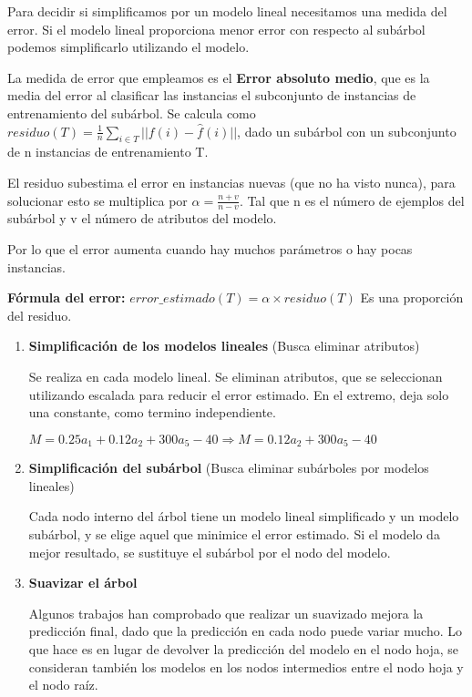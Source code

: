 \documentclass[12pt, twoside, openright]{report} %
\begin{document}
Para decidir si simplificamos por un modelo lineal necesitamos una medida del error. Si el modelo lineal proporciona menor error con respecto al subárbol podemos simplificarlo utilizando el modelo.

La medida de error que empleamos es el \textbf{Error absoluto medio}, que es la media del error al clasificar las instancias el subconjunto de instancias de entrenamiento del subárbol. Se calcula como $residuo(T) = \frac 1 n \sum _{i \in T} ||f(i)- \hat{f}(i)||$, dado un subárbol con un subconjunto de n instancias de entrenamiento T.

El residuo subestima el error en instancias nuevas (que no ha visto nunca), para solucionar esto se multiplica por \(\alpha = \frac {n+v}{n-v}\). Tal que n es el número de ejemplos del subárbol y v el número de atributos del modelo.

Por lo que el error aumenta cuando hay muchos parámetros o hay pocas instancias.

\textbf{Fórmula del error:} \(error\_estimado(T) = \alpha \times residuo(T)\) Es una proporción del residuo.

\begin{enumerate}
	\def\labelenumi{\arabic{enumi}.}
	\item \textbf{Simplificación de los modelos lineales} (Busca eliminar atributos)

	      Se realiza en cada modelo lineal. Se eliminan atributos, que se seleccionan utilizando escalada para reducir el error estimado. En el extremo, deja solo una constante, como termino independiente.

	      \(M= 0.25a_1+0.12a_2+300a_5-40 \Rightarrow M=0.12a_2+300a_5-40\)
	\item \textbf{Simplificación del subárbol} (Busca eliminar subárboles por modelos lineales)

	      Cada nodo interno del árbol tiene un modelo lineal simplificado y un modelo subárbol, y se elige aquel que minimice el error estimado. Si el modelo da mejor resultado, se sustituye el subárbol por el nodo del modelo.
	\item \textbf{Suavizar el árbol}

	      Algunos trabajos han comprobado que realizar un suavizado mejora la predicción final, dado que la predicción en cada nodo puede variar mucho. Lo que hace es en lugar de devolver la predicción del modelo en el nodo hoja, se consideran también los modelos en los nodos intermedios entre el nodo hoja y el nodo raíz.
\end{enumerate}
\end{document}
